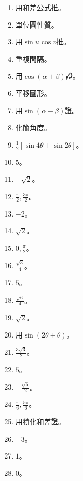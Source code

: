 \begin{enumerate}[label=\arabic*.]
    \item 用和差公式推。
    \item 單位圓性質。
    \item 用$\sin u \cos v$推。
    \item 重複間隔。
    \item 用$\cos(\alpha + \beta)$證。
    \item 平移圖形。
    \item 用$\sin(\alpha - \beta)$證。
    \item 化簡角度。
    \item $\frac{1}{2} [\sin 4\theta + \sin 2\theta]$。
    \item $5$。
    \item $-\sqrt{2}$。
    \item $\frac{\pi}{2}, \frac{3\pi}{2}$。
    \item $-2$。
    \item $\sqrt{2}$。
    \item $0, \frac{\pi}{2}$。
    \item $\frac{\sqrt{3}}{4}$。
    \item $5$。
    \item $\frac{\sqrt{6}}{4}$。
    \item $\sqrt{2}$。
    \item 用$\sin(2\theta + \theta)$。
    \item $\frac{3\sqrt{3}}{2}$。
    \item $5$。
    \item $-\frac{\sqrt{6}}{2}$。
    \item $\frac{\pi}{6}, \frac{5\pi}{6}$。
    \item 用積化和差證。
    \item $-3$。
    \item $1$。
    \item $0$。
\end{enumerate}

